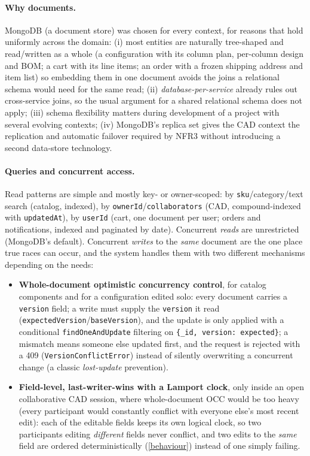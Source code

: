 \paragraph{Why documents.} MongoDB (a document store) was chosen for every
context, for reasons that hold uniformly across the domain: (i) most entities
are naturally tree-shaped and read/written as a whole (a configuration
with its column plan, per-column design and BOM; a cart with its line items;
an order with a frozen shipping address and item list) so embedding them
in one document avoids the joins a relational schema would need for the same
read; (ii) \emph{database-per-service} already rules out cross-service joins,
so the usual argument for a shared relational schema does not apply; (iii)
schema flexibility matters during development of a project with several
evolving contexts; (iv) MongoDB's replica set gives the CAD context the
replication and automatic failover required by NFR3 without introducing a
second data-store technology.

\paragraph{Queries and concurrent access.} Read patterns are simple and
mostly key- or owner-scoped: by \texttt{sku}/category/text search (catalog,
indexed), by \texttt{ownerId}/\texttt{collaborators} (CAD, compound-indexed
with \texttt{updatedAt}), by \texttt{userId} (cart, one document per user;
orders and notifications, indexed and paginated by date). Concurrent
\emph{reads} are unrestricted (MongoDB's default). Concurrent \emph{writes} to the
\emph{same} document are the one place true races can occur, and the system
handles them with two different mechanisms depending on the needs:

\begin{itemize}
  \item \textbf{Whole-document optimistic concurrency control}, for catalog
  components and for a configuration edited solo: every document carries a
  \texttt{version} field; a write must supply the \texttt{version} it read
  (\texttt{expectedVersion}/\texttt{baseVersion}), and the update is only
  applied with a conditional \texttt{findOneAndUpdate} filtering on
  \texttt{\{\_id, version: expected\}}; a mismatch means someone else updated
  first, and the request is rejected with a 409 (\texttt{VersionConflictError})
  instead of silently overwriting a concurrent change (a classic
  \emph{lost-update} prevention).

  \item \textbf{Field-level, last-writer-wins with a Lamport clock}, only
  inside an open collaborative CAD session, where whole-document OCC would be
  too heavy (every participant would constantly conflict with everyone
  else's most recent edit): each of the editable fields keeps its own
  logical clock, so two participants editing \emph{different} fields never
  conflict, and two edits to the \emph{same} field are ordered
  deterministically (\cref{behaviour}) instead of one simply failing.
\end{itemize}

